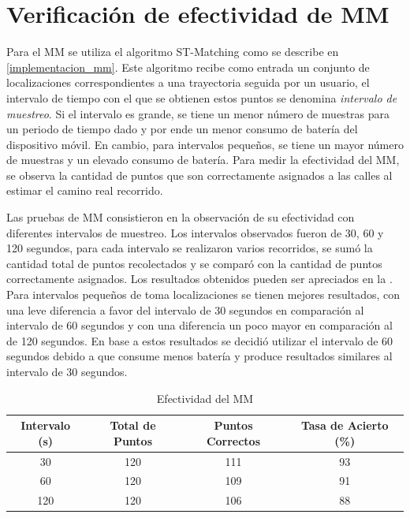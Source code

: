 \section{Verificación de efectividad de MM}

Para el MM se utiliza el algoritmo ST-Matching como se describe en \cref{implementacion_mm}. Este algoritmo recibe como entrada un conjunto de localizaciones correspondientes a una trayectoria seguida por un usuario, el intervalo de tiempo con el que se obtienen estos puntos se denomina \emph{intervalo de muestreo}. Si el intervalo es grande, se tiene un menor número de muestras para un periodo de tiempo dado y por ende un menor consumo de batería del dispositivo móvil. En cambio, para intervalos pequeños, se tiene un mayor número de muestras y un elevado consumo de batería. Para medir la efectividad del MM, se observa la cantidad de puntos que son correctamente asignados a las calles al estimar el camino real recorrido.

Las pruebas de MM consistieron en la observación de su efectividad con diferentes intervalos de muestreo. Los intervalos observados fueron de 30, 60 y 120 segundos, para cada intervalo se realizaron varios recorridos, se sumó la cantidad total de puntos recolectados y se comparó con la cantidad de puntos correctamente asignados. Los resultados obtenidos pueden ser apreciados en la . Para intervalos pequeños de toma localizaciones se tienen mejores resultados, con una leve diferencia a favor del intervalo de 30 segundos en comparación al intervalo de 60 segundos y con una diferencia un poco mayor en comparación al de 120 segundos. En base a estos resultados se decidió utilizar el intervalo de 60 segundos debido a que consume menos batería y produce resultados similares al intervalo de 30 segundos.

\begin{table}[h]
	\centering
	\begin{tabular}{cccc}
        \toprule
    	Intervalo (s) & Total de Puntos & Puntos Correctos & Tasa de Acierto (\%)\\
    	\midrule
    	30 & 120  & 111 & 93 \\
    	60 & 120 & 109 & 91 \\
    	120 & 120 & 106 & 88 \\ 
    	\bottomrule
	\end{tabular}
	\caption{Efectividad del MM} 
	\label{table:map_matching}
\end{table}

